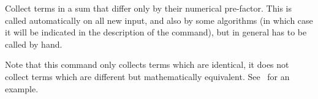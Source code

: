 
\label{loc_collect_terms}
Collect terms in a sum that differ only by their numerical
pre-factor. This is called automatically on all new input, and also by
some algorithms (in which case it will be indicated in the description
of the command), but in general has to be called by hand.

Note that this command only collects terms which are identical, it
does not collect terms which are different but mathematically
equivalent. See~ for an example.

